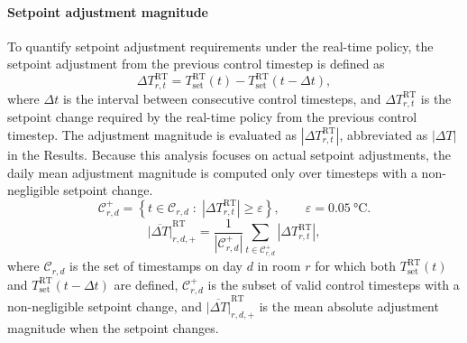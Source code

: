 \paragraph{Setpoint adjustment magnitude}
To quantify setpoint adjustment requirements under the real-time policy, the setpoint adjustment from the previous control timestep is defined as
\begin{equation}
\Delta T_{r,t}^{\mathrm{RT}}
=
T_{\mathrm{set}}^{\mathrm{RT}}(t)
-
T_{\mathrm{set}}^{\mathrm{RT}}(t-\Delta t),
\label{eq:rt_setpoint_step}
\end{equation}
where $\Delta t$ is the interval between consecutive control timesteps, and $\Delta T_{r,t}^{\mathrm{RT}}$ is the setpoint change required by the real-time policy from the previous control timestep.
The adjustment magnitude is evaluated as $|\Delta T_{r,t}^{\mathrm{RT}}|$, abbreviated as $|\Delta T|$ in the Results.
Because this analysis focuses on actual setpoint adjustments, the daily mean adjustment magnitude is computed only over timesteps with a non-negligible setpoint change.
\begin{equation}
\mathcal{C}_{r,d}^{+}
=
\left\{
t\in\mathcal{C}_{r,d}
\;:\;
\left|\Delta T_{r,t}^{\mathrm{RT}}\right| \geq \varepsilon
\right\},
\qquad
\varepsilon=\qty{0.05}{\celsius}.
\label{eq:changed_step_set}
\end{equation}
\begin{equation}
\overline{|\Delta T|}_{r,d,+}^{\mathrm{RT}}
=
\frac{1}{|\mathcal{C}_{r,d}^{+}|}
\sum_{t\in\mathcal{C}_{r,d}^{+}}
\left|\Delta T_{r,t}^{\mathrm{RT}}\right|,
\label{eq:rt_mean_abs_step_when_changed_daily}
\end{equation}
where $\mathcal{C}_{r,d}$ is the set of timestamps on day $d$ in room $r$ for which both $T_{\mathrm{set}}^{\mathrm{RT}}(t)$ and $T_{\mathrm{set}}^{\mathrm{RT}}(t-\Delta t)$ are defined, $\mathcal{C}_{r,d}^{+}$ is the subset of valid control timesteps with a non-negligible setpoint change, and $\overline{|\Delta T|}_{r,d,+}^{\mathrm{RT}}$ is the mean absolute adjustment magnitude when the setpoint changes.

